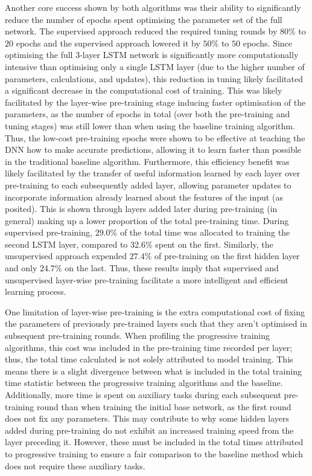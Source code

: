 \documentclass[a4paper, 11pt]{report}
\begin{document}
    Another core success shown by both algorithms was their ability to significantly reduce the number of epochs spent optimising the parameter set of the full network. The supervised approach reduced the required tuning rounds by $80\%$ to $20$ epochs and the supervised approach lowered it by $50\%$ to $50$ epochs. Since optimising the full 3-layer LSTM network is significantly more computationally intensive than optimising only a single LSTM layer (due to the higher number of parameters, calculations, and updates), this reduction in tuning likely facilitated a significant decrease in the computational cost of training. This was likely facilitated by the layer-wise pre-training stage inducing faster optimisation of the parameters, as the number of epochs in total (over both the pre-training and tuning stages) was still lower than when using the baseline training algorithm. Thus, the low-cost pre-training epochs were shown to be effective at teaching the DNN how to make accurate predictions, allowing it to learn faster than possible in the traditional baseline algorithm. Furthermore, this efficiency benefit was likely facilitated by the transfer of useful information learned by each layer over pre-training to each subsequently added layer, allowing parameter updates to incorporate information already learned about the features of the input (as \citet{xu-2021} posited). This is shown through layers added later during pre-training (in general) making up a lower proportion of the total pre-training time. During supervised pre-training, $29.0\%$ of the total time was allocated to training the second LSTM layer, compared to $32.6\%$ spent on the first. Similarly, the unsupervised approach expended $27.4\%$ of pre-training on the first hidden layer and only $24.7\%$ on the last. Thus, these results imply that supervised and unsupervised layer-wise pre-training facilitate a more intelligent and efficient learning process. 

    One limitation of layer-wise pre-training is the extra computational cost of fixing the parameters of previously pre-trained layers such that they aren't optimised in subsequent pre-training rounds. When profiling the progressive training algorithms, this cost was included in the pre-training time recorded per layer; thus, the total time calculated is not solely attributed to model training. This means there is a slight divergence between what is included in the total training time statistic between the progressive training algorithms and the baseline. Additionally, more time is spent on auxiliary tasks during each subsequent pre-training round than when training the initial base network, as the first round does not fix any parameters. This may contribute to why some hidden layers added during pre-training do not exhibit an increased training speed from the layer preceding it. However, these must be included in the total times attributed to progressive training to ensure a fair comparison to the baseline method which does not require these auxiliary tasks.
\end{document}
